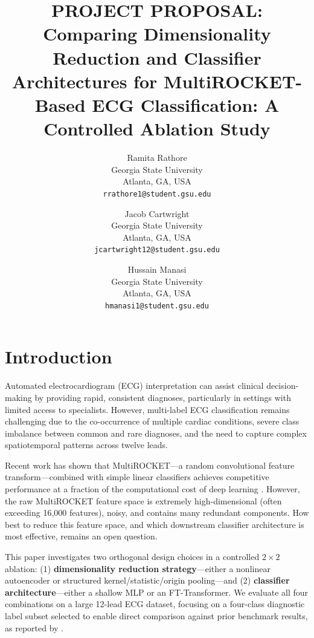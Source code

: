 \documentclass[10pt,twocolumn,letterpaper]{article}
\begin{document}
\title{PROJECT PROPOSAL: Comparing Dimensionality Reduction and Classifier Architectures for MultiROCKET-Based ECG Classification: A Controlled Ablation Study}

\author{Ramita Rathore\\
Georgia State University\\
Atlanta, GA, USA \\
{\tt\small rrathore1@student.gsu.edu}
\and
Jacob Cartwright\\
Georgia State University\\
Atlanta, GA, USA \\
{\tt\small jcartwright12@student.gsu.edu}
\and
Hussain Manasi\\
Georgia State University\\
Atlanta, GA, USA \\
{\tt\small hmanasi1@student.gsu.edu}
}

\maketitle

\section{Introduction}

Automated electrocardiogram (ECG) interpretation can assist clinical decision-making by providing rapid, consistent diagnoses, particularly in settings with limited access to specialists. However, multi-label ECG classification remains challenging due to the co-occurrence of multiple cardiac conditions, severe class imbalance between common and rare diagnoses, and the need to capture complex spatiotemporal patterns across twelve leads.

Recent work has shown that MultiROCKET—a random convolutional feature transform—combined with simple linear classifiers achieves competitive performance at a fraction of the computational cost of deep learning \cite{tan2022, wang2023}. However, the raw MultiROCKET feature space is extremely high-dimensional (often exceeding 16,000 features), noisy, and contains many redundant components. How best to reduce this feature space, and which downstream classifier architecture is most effective, remains an open question.

This paper investigates two orthogonal design choices in a controlled $2 \times 2$ ablation: (1) \textbf{dimensionality reduction strategy}—either a nonlinear autoencoder or structured kernel/statistic/origin pooling—and (2) \textbf{classifier architecture}—either a shallow MLP or an FT-Transformer. We evaluate all four combinations on a large 12-lead ECG dataset, focusing on a four-class diagnostic label subset selected to enable direct comparison against prior benchmark results, as reported by \cite{zheng2022}.
\end{document}
